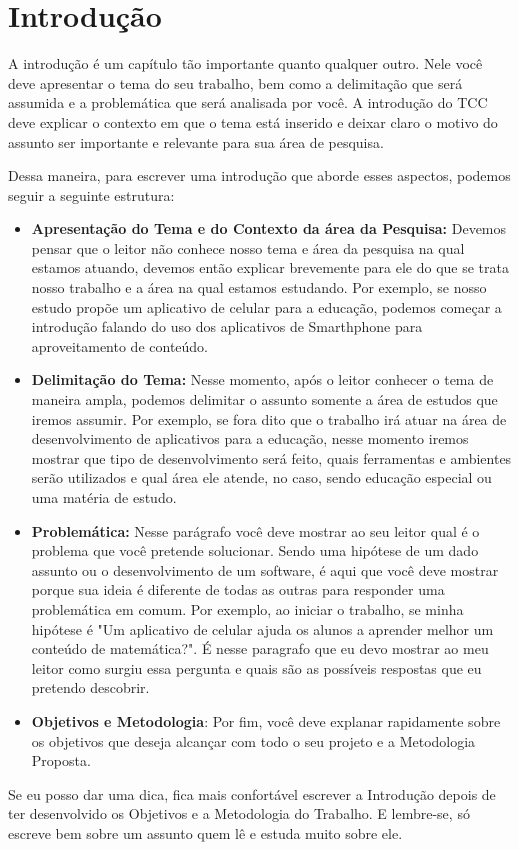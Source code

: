 \chapter{Introdução}

A introdução é um capítulo tão importante quanto qualquer outro. Nele você deve apresentar o tema do seu trabalho, bem como a delimitação que será assumida e a problemática que será analisada por você. A introdução do TCC deve explicar o contexto em que o tema está inserido e deixar claro o motivo do assunto ser importante e relevante para sua área de pesquisa.

Dessa maneira, para escrever uma introdução que aborde esses aspectos, podemos seguir a seguinte estrutura:

\begin{itemize}
    \item \textbf{Apresentação do Tema e do Contexto da área da Pesquisa:} Devemos pensar que o leitor não conhece nosso tema e área da pesquisa na qual estamos atuando, devemos então explicar brevemente para ele do que se trata nosso trabalho e a área na qual estamos estudando. Por exemplo, se nosso estudo propõe um aplicativo de celular para a educação, podemos começar a introdução falando do uso dos aplicativos de Smarthphone para aproveitamento de conteúdo.  
    
    \item \textbf{Delimitação do Tema:} Nesse momento, após o leitor conhecer o tema de maneira ampla, podemos delimitar o assunto somente a área de estudos que iremos assumir. Por exemplo, se fora dito que o trabalho irá atuar na área de desenvolvimento de aplicativos para a educação, nesse momento iremos mostrar que tipo de desenvolvimento será feito, quais ferramentas e ambientes serão utilizados e qual área ele atende, no caso, sendo educação especial ou uma matéria de estudo.
    
    \item \textbf{Problemática:} Nesse parágrafo você deve mostrar ao seu leitor qual é o problema que você pretende solucionar. Sendo uma hipótese de um dado assunto ou o desenvolvimento de um software, é aqui que você deve mostrar porque sua ideia é diferente de todas as outras para responder uma problemática em comum. Por exemplo, ao iniciar o trabalho, se minha hipótese é "Um aplicativo de celular ajuda os alunos a aprender melhor um conteúdo de matemática?". É nesse paragrafo que eu devo mostrar ao meu leitor como surgiu essa pergunta e quais são as possíveis respostas que eu pretendo descobrir.
    
    \item \textbf{Objetivos e Metodologia}: Por fim, você deve explanar rapidamente sobre os objetivos que deseja alcançar com todo o seu projeto e a Metodologia Proposta.
\end{itemize}

Se eu posso dar uma dica, fica mais confortável escrever a Introdução depois de ter desenvolvido os Objetivos e a Metodologia do Trabalho.
E lembre-se, só escreve bem sobre um assunto quem lê e estuda muito sobre ele.


